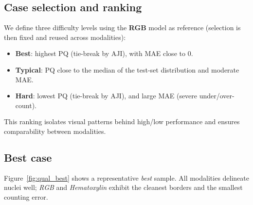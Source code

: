 \documentclass[target=bach,aauheader=,style=]{thud}
\begin{document}
\subsection{Case selection and ranking}
We define three difficulty levels using the \textbf{RGB} model as reference (selection is then fixed and reused across modalities):
\begin{itemize}
  \item \textbf{Best}: highest PQ (tie-break by AJI), with MAE close to $0$.
  \item \textbf{Typical}: PQ close to the median of the test-set distribution and moderate MAE.
  \item \textbf{Hard}: lowest PQ (tie-break by AJI), and large MAE (severe under/over-count).
\end{itemize}
This ranking isolates visual patterns behind high/low performance and ensures comparability between modalities.


\subsection{Best case}
Figure~\ref{fig:qual_best} shows a representative \emph{best} sample. All modalities delineate nuclei well; \emph{RGB} and \emph{Hematoxylin} exhibit the cleanest borders and the smallest counting error.
\end{document}
